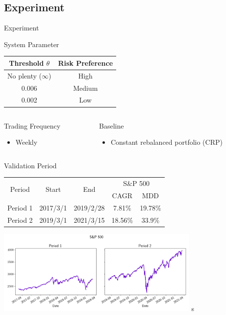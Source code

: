 \subsection{Experiment}
\begin{frame}{Experiment}
\begin{block}{System Parameter}
    \centering
    \begin{tabular}{c|c}
    Threshold $\theta$ & Risk Preference \\ \hline
    No plenty ($\infty$) & High \\ 
    0.006 & Medium      \\ 
    0.002 & Low      \\
    \end{tabular}
\end{block}
\begin{columns}[t]
    \begin{column}{0.45\textwidth}
    
    \begin{block}{Trading Frequency}
    \begin{itemize}
        \item  Weekly
    \end{itemize}
    \end{block}
    \end{column}
    \begin{column}{0.45\textwidth}
    \begin{block}{Baseline}
    \begin{itemize}
        \item  Constant rebalanced portfolio (CRP)
    \end{itemize}
    \end{block}
    \end{column}
\end{columns}



\end{frame}

\begin{frame}{Validation Period}
\begin{tabular}{||c|c|c|c|c||}
    \hline \hline
    \multirow{2}{*}{Period} &
    \multirow{2}{*}{Start} &
    \multirow{2}{*}{End} &
    \multicolumn{2}{c||}{S\&P 500} \\ 
    \cline{4-5} &{} &{} & CAGR & MDD \\ \hline \hline
    Period 1 & 2017/3/1 & 2019/2/28 & 7.81\% & 19.78\% \\ \hline
    Period 2 & 2019/3/1 & 2021/3/15 & 18.56\% & 33.9\% \\    
    \hline \hline
    \end{tabular}
      \centering
    \includegraphics[width=10cm]{images/sp500.png}
s
\end{frame}


